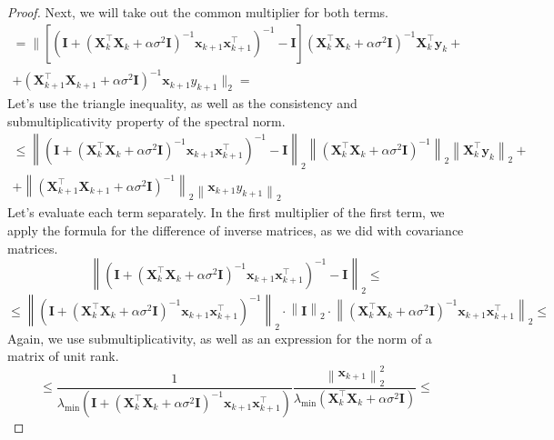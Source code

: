 \documentclass[runningheads]{llncs}
\begin{document}
\begin{proof}
Next, we will take out the common multiplier for both terms.
    \begin{multline*}
        = \Bigg\| \left[ \left( \mathbf{I} + \left( \mathbf{X}_k^{\top} \mathbf{X}_k + \alpha \sigma^2 \mathbf{I} \right)^{-1} \mathbf{x}_{k+1} \mathbf{x}_{k+1}^{\top} \right)^{-1} - \mathbf{I} \right] \left( \mathbf{X}_k^{\top} \mathbf{X}_k + \alpha \sigma^2 \mathbf{I} \right)^{-1} \mathbf{X}_k^{\top} \mathbf{y}_k + \\ + \left( \mathbf{X}_{k+1}^{\top} \mathbf{X}_{k+1} + \alpha \sigma^2 \mathbf{I} \right)^{-1} \mathbf{x}_{k+1} y_{k+1} \Bigg\|_2 =
    \end{multline*}
    Let's use the triangle inequality, as well as the consistency and submultiplicativity property of the spectral norm.
    \begin{multline*}
        \leqslant \left\| \left( \mathbf{I} + \left( \mathbf{X}_k^{\top} \mathbf{X}_k + \alpha \sigma^2 \mathbf{I} \right)^{-1} \mathbf{x}_{k+1} \mathbf{x}_{k+1}^{\top} \right)^{-1} - \mathbf{I} \right\|_2 \left\| \left( \mathbf{X}_k^{\top} \mathbf{X}_k + \alpha \sigma^2 \mathbf{I} \right)^{-1} \right\|_2 \left\| \mathbf{X}_k^{\top} \mathbf{y}_k \right\|_2 + \\ + \left\| \left( \mathbf{X}_{k+1}^{\top} \mathbf{X}_{k+1} + \alpha \sigma^2 \mathbf{I} \right)^{-1} \right\|_2 \left\| \mathbf{x}_{k+1} y_{k+1} \right\|_2
    \end{multline*}
    Let's evaluate each term separately. In the first multiplier of the first term, we apply the formula for the difference of inverse matrices, as we did with covariance matrices.
    \[ \left\| \left( \mathbf{I} + \left( \mathbf{X}_k^{\top} \mathbf{X}_k + \alpha \sigma^2 \mathbf{I} \right)^{-1} \mathbf{x}_{k+1} \mathbf{x}_{k+1}^{\top} \right)^{-1} - \mathbf{I} \right\|_2 \leqslant \]
    \[ \leqslant \left\| \left( \mathbf{I} + \left( \mathbf{X}_k^{\top} \mathbf{X}_k + \alpha \sigma^2 \mathbf{I} \right)^{-1} \mathbf{x}_{k+1} \mathbf{x}_{k+1}^{\top} \right)^{-1} \right\|_2 \cdot \left\| \mathbf{I} \right\|_2 \cdot \left\| \left( \mathbf{X}_k^{\top} \mathbf{X}_k + \alpha \sigma^2 \mathbf{I} \right)^{-1} \mathbf{x}_{k+1} \mathbf{x}_{k+1}^{\top} \right\|_2 \leqslant \]
    Again, we use submultiplicativity, as well as an expression for the norm of a matrix of unit rank.
    \[ \leqslant \dfrac{1}{\lambda_{\min}\left( \mathbf{I} + \left( \mathbf{X}_k^{\top} \mathbf{X}_k + \alpha \sigma^2 \mathbf{I} \right)^{-1} \mathbf{x}_{k+1} \mathbf{x}_{k+1}^{\top} \right)} \dfrac{\left\| \mathbf{x}_{k+1} \right\|_2^2}{\lambda_{\min}\left( \mathbf{X}_k^{\top} \mathbf{X}_k + \alpha \sigma^2 \mathbf{I} \right)} \leqslant \]

\end{proof}
\end{document}
